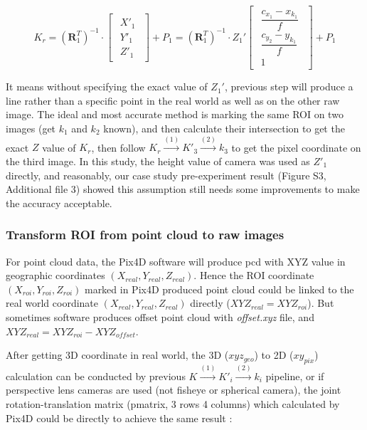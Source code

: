 \documentclass[doublespacing]{configs/bmcart}
\begin{document}
$$
  K_r = 
  \left(\mathbf{R}_1^T\right)^{-1} \cdot 
  \begin{bmatrix}
    \begin{matrix}
      X'_1 \\ Y'_1 \\ Z'_1
    \end{matrix}
  \end{bmatrix} + P_1
  =
  \left(\mathbf{R}_1^T\right)^{-1} \cdot Z_1'
  \begin{bmatrix}
    \begin{matrix}
      \dfrac{c_{x_1}- x_{k_1}}{f} \\ \dfrac{c_{y_2} - y_{k_1}}{f} \\ 1
    \end{matrix}
  \end{bmatrix} + P_1
$$

It means without specifying the exact value of $Z_1'$, previous step will produce a line rather than a specific point in the real world as well as on the other raw image. The ideal and most accurate method is marking the same ROI on two images (get $k_1$ and $k_2$ known), and then calculate their intersection to get the exact $Z$ value of $K_r$, then follow $K_r \xrightarrow{(1)} K'_3 \xrightarrow{(2)} k_3$ to get the pixel coordinate on the third image. In this study, the height value of camera was used as $Z'_1$ directly, and reasonably, our case study pre-experiment result (Figure S3, Additional file 3) showed this assumption still needs some improvements to make the accuracy acceptable.

\subsubsection*{Transform ROI from point cloud to raw images}

For point cloud data, the Pix4D software will produce \acrshort*{pcd} with XYZ value in geographic coordinates $(X_{real}, Y_{real}, Z_{real})$. Hence the ROI coordinate $(X_{roi}, Y_{roi}, Z_{roi})$ marked in Pix4D produced point cloud could be linked to the real world coordinate $(X_{real}, Y_{real}, Z_{real})$ directly ($XYZ_{real} = XYZ_{roi}$). But sometimes software produces offset point cloud with \textit{offset.xyz} file, and $XYZ_{real} = XYZ_{roi} - XYZ_{offset}$.

After getting 3D coordinate in real world, the 3D ($xyz_{geo}$) to 2D ($xy_{pix}$) calculation can be conducted by previous $K \xrightarrow{(1)} K'_i \xrightarrow{(2)} k_i$ pipeline, or if perspective lens cameras are used (not fisheye or spherical camera), the joint rotation-translation matrix (pmatrix, 3 rows 4 columns) which calculated by Pix4D could be directly to achieve the same result \cite{pix4d_support_what_2020}:
\end{document}

